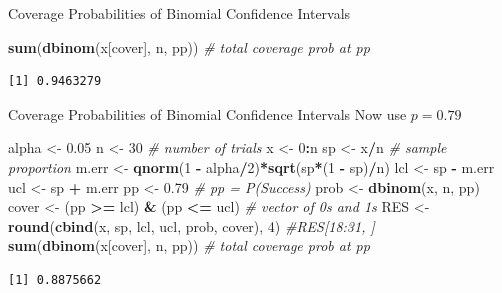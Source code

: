 \documentclass[
  ignorenonframetext,
]{beamer}
\newenvironment{Shaded}{\begin{snugshade}}{\end{snugshade}}
\newcommand{\CommentTok}[1]{\textcolor[rgb]{0.56,0.35,0.01}{\textit{#1}}}
\newcommand{\DecValTok}[1]{\textcolor[rgb]{0.00,0.00,0.81}{#1}}
\newcommand{\FloatTok}[1]{\textcolor[rgb]{0.00,0.00,0.81}{#1}}
\newcommand{\FunctionTok}[1]{\textcolor[rgb]{0.13,0.29,0.53}{\textbf{#1}}}
\newcommand{\NormalTok}[1]{#1}
\newcommand{\OtherTok}[1]{\textcolor[rgb]{0.56,0.35,0.01}{#1}}
\newcommand{\SpecialCharTok}[1]{\textcolor[rgb]{0.81,0.36,0.00}{\textbf{#1}}}
\begin{document}
\begin{frame}[fragile]{Coverage Probabilities of Binomial Confidence
Intervals}
\begin{Shaded}
\begin{Highlighting}[]
\FunctionTok{sum}\NormalTok{(}\FunctionTok{dbinom}\NormalTok{(x[cover], n, pp))  }\CommentTok{\# total coverage prob at pp}
\end{Highlighting}
\end{Shaded}

\begin{verbatim}
[1] 0.9463279
\end{verbatim}

\normalsize
\end{frame}

\begin{frame}[fragile]{Coverage Probabilities of Binomial Confidence
Intervals}
\label{coverage-probabilities-of-binomial-confidence-intervals-4}
Now use \(p=0.79\) \tiny

\begin{Shaded}
\begin{Highlighting}[]
\NormalTok{alpha }\OtherTok{\textless{}{-}} \FloatTok{0.05}
\NormalTok{n }\OtherTok{\textless{}{-}} \DecValTok{30}   \CommentTok{\# number of trials}
\NormalTok{x }\OtherTok{\textless{}{-}} \DecValTok{0}\SpecialCharTok{:}\NormalTok{n  }
\NormalTok{sp }\OtherTok{\textless{}{-}}\NormalTok{ x}\SpecialCharTok{/}\NormalTok{n }\CommentTok{\# sample proportion}
\NormalTok{m.err }\OtherTok{\textless{}{-}} \FunctionTok{qnorm}\NormalTok{(}\DecValTok{1} \SpecialCharTok{{-}}\NormalTok{ alpha}\SpecialCharTok{/}\DecValTok{2}\NormalTok{)}\SpecialCharTok{*}\FunctionTok{sqrt}\NormalTok{(sp}\SpecialCharTok{*}\NormalTok{(}\DecValTok{1} \SpecialCharTok{{-}}\NormalTok{ sp)}\SpecialCharTok{/}\NormalTok{n)}
\NormalTok{lcl }\OtherTok{\textless{}{-}}\NormalTok{ sp }\SpecialCharTok{{-}}\NormalTok{ m.err}
\NormalTok{ucl }\OtherTok{\textless{}{-}}\NormalTok{ sp }\SpecialCharTok{+}\NormalTok{ m.err}
\NormalTok{pp }\OtherTok{\textless{}{-}} \FloatTok{0.79}   \CommentTok{\# pp = P(Success)}
\NormalTok{prob }\OtherTok{\textless{}{-}} \FunctionTok{dbinom}\NormalTok{(x, n, pp)}
\NormalTok{cover }\OtherTok{\textless{}{-}}\NormalTok{ (pp }\SpecialCharTok{\textgreater{}=}\NormalTok{ lcl) }\SpecialCharTok{\&}\NormalTok{ (pp }\SpecialCharTok{\textless{}=}\NormalTok{ ucl)  }\CommentTok{\# vector of 0s and 1s}
\NormalTok{RES }\OtherTok{\textless{}{-}} \FunctionTok{round}\NormalTok{(}\FunctionTok{cbind}\NormalTok{(x, sp, lcl, ucl, prob, cover), }\DecValTok{4}\NormalTok{)}
\CommentTok{\#RES[18:31, ]}
\FunctionTok{sum}\NormalTok{(}\FunctionTok{dbinom}\NormalTok{(x[cover], n, pp))  }\CommentTok{\# total coverage prob at pp}
\end{Highlighting}
\end{Shaded}

\begin{verbatim}
[1] 0.8875662
\end{verbatim}

\normalsize
\end{frame}
\end{document}
